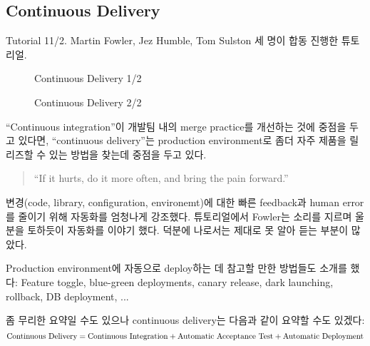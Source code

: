 \documentclass[11pt]{article}
\begin{document}
\subsection{Continuous Delivery}
Tutorial 11/2.
Martin Fowler, Jez Humble, Tom Sulston 세 명이 합동 진행한 튜토리얼.
%

\begin{figure}[t]
    \begin{Frame}
        \begin{center}
        \end{center}
    \end{Frame}
    \caption{Continuous Delivery 1/2}
    \label{Continuous Delivery 1}
\end{figure}

\begin{figure}[t]
    \begin{Frame}
        \begin{center}
        \end{center}
    \end{Frame}
    \caption{Continuous Delivery 2/2}
    \label{Continuous Delivery 2}
\end{figure}

``Continuous integration''이 개발팀 내의 merge practice를 개선하는 것에
중점을 두고 있다면, ``continuous delivery''\cite{hufa10}는 
production environment로 좀더 자주 제품을 릴리즈할 수 있는 방법을 찾는데 
중점을 두고 있다.

\begin{quote}
``If it hurts, do it more often, and bring the pain forward.''  
\end{quote}

변경(code, library, configuration, environemt)에 대한 빠른 feedback과
human error를 줄이기 위해 자동화를 엄청나게 강조했다. 튜토리얼에서 Fowler는
소리를 지르며 울분을 토하듯이 자동화를 이야기 했다. 덕분에 나로서는 
제대로 못 알아 듣는 부분이 많았다.

Production environment에 자동으로 deploy하는 데 참고할 만한 방법들도 소개를
했다: Feature toggle, blue-green deployments, canary release, dark launching,
rollback, DB deployment, ...

좀 무리한 요약일 수도 있으나 continuous delivery는 다음과 같이 요약할 수도 
있겠다:
\[
    \textrm{Continuous Delivery} = \textrm{Continuous Integration} + \textrm{Automatic Acceptance Test} + \textrm{Automatic Deployment}
\]
\end{document}
